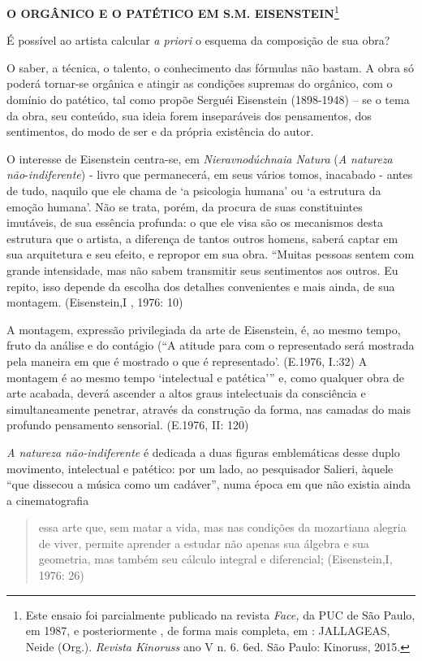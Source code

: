 \textbf{O ORGÂNICO E O PATÉTICO EM S.M. EISENSTEIN}\footnote{Este ensaio
  foi parcialmente publicado na revista \emph{Face,} da PUC de São
  Paulo, em 1987, e posteriormente , de forma mais completa, em :
  JALLAGEAS, Neide (Org.). \emph{Revista Kinoruss} ano V n. 6. 6ed. São
  Paulo: Kinoruss, 2015.}

É possível ao artista calcular \emph{a priori} o esquema da composição
de sua obra?

O saber, a técnica, o talento, o conhecimento das fórmulas não bastam. A
obra só poderá tornar-se orgânica e atingir as condições supremas do
orgânico, com o domínio do patético, tal como propõe Serguéi Eisenstein
(1898-1948) -- se o tema da obra, seu conteúdo, sua ideia forem
inseparáveis dos pensamentos, dos sentimentos, do modo de ser e da
própria existência do autor.

O interesse de Eisenstein centra-se, em \emph{Nieravnodúchnaia Natura}
(\emph{A natureza não}-\emph{indiferente}) - livro que permanecerá, em
seus vários tomos, inacabado - antes de tudo, naquilo que ele chama de
`a psicologia humana' ou `a estrutura da emoção humana'. Não se trata,
porém, da procura de suas constituintes imutáveis, de sua essência
profunda: o que ele visa são os mecanismos desta estrutura que o
artista, a diferença de tantos outros homens, saberá captar em sua
arquitetura e seu efeito, e repropor em sua obra. ``Muitas pessoas
sentem com grande intensidade, mas não sabem transmitir seus sentimentos
aos outros. Eu repito, isso depende da escolha dos detalhes convenientes
e mais ainda, de sua montagem. (Eisenstein,I , 1976: 10)

A montagem, expressão privilegiada da arte de Eisenstein, é, ao mesmo
tempo, fruto da análise e do contágio (``A atitude para com o
representado será mostrada pela maneira em que é mostrado o que é
representado'. (E.1976, I.:32) A montagem é ao mesmo tempo `intelectual
e patética''' e, como qualquer obra de arte acabada, deverá ascender a
altos graus intelectuais da consciência e simultaneamente penetrar,
através da construção da forma, nas camadas do mais profundo pensamento
sensorial. (E.1976, II: 120)

\emph{A natureza não-indiferente} é dedicada a duas figuras emblemáticas
desse duplo movimento, intelectual e patético: por um lado, ao
pesquisador Salieri, àquele ``que dissecou a música como um cadáver'',
numa época em que não existia ainda a cinematografia

\begin{quote}
essa arte que, sem matar a vida, mas nas condições da mozartiana alegria
de viver, permite aprender a estudar não apenas sua álgebra e sua
geometria, mas também seu cálculo integral e diferencial; (Eisenstein,I,
1976: 26)
\end{quote}

